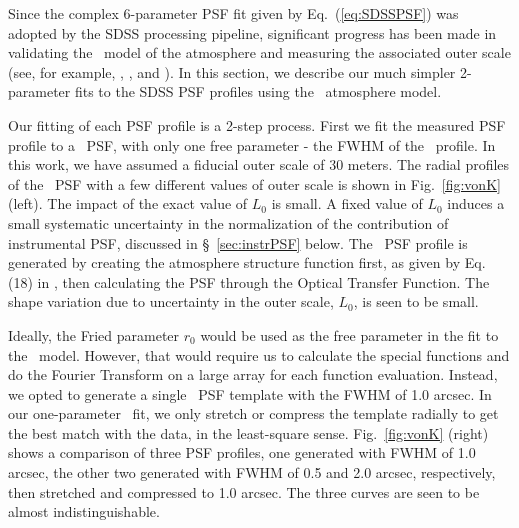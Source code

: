 

Since the complex 6-parameter PSF fit given by Eq.~(\ref{eq:SDSSPSF}) was adopted by 
the SDSS processing pipeline, significant progress has been made in validating the 
\vk~model of the atmosphere and measuring the associated outer
scale (see, for example, \citealt{Tokovinin2002}, \citealt{Boccas2004}, and \citealt{MartinezMessenger}).
In this section, we describe our much simpler 2-parameter fits to the SDSS PSF
profiles using the \vk~atmosphere model.

Our fitting of each PSF profile is a 2-step process. First we fit the
measured PSF profile to a \vk~PSF, with only one free parameter -
the FWHM of the \vk~profile.  
In this work, we have assumed a fiducial outer scale of 30 meters.
The radial profiles of the \vk~PSF with a few different values of 
outer scale is shown in Fig.~\ref{fig:vonK} (left). 
The impact of the exact value of $L_0$ is small. 
A fixed value of $L_0$ induces a small systematic uncertainty in 
the normalization of the contribution of instrumental PSF, discussed in \S~\ref{sec:instrPSF} 
below. 
The \vk~PSF profile is generated by creating the atmosphere
structure function first, as given by Eq. (18) in \cite{Tokovinin2002}, then calculating the
PSF through the Optical Transfer Function. 
The shape variation due to uncertainty in the outer scale, $L_0$, is seen to
be small. 

Ideally, the Fried parameter $r_0$ would be used as the free
parameter in the fit to the \vk~model. However, 
that would require us to calculate the special functions and do the
Fourier Transform on a large array for each function evaluation.
Instead, we opted to generate a single \vk~PSF template with the FWHM of 
1.0 arcsec. In our one-parameter \vk~fit, we only stretch or compress
the template radially to get the best match with the data, in the
least-square sense.
Fig.~\ref{fig:vonK} (right) shows a comparison of three PSF profiles,
one generated with FWHM of 1.0 arcsec, the other two generated with
FWHM of 0.5 and 2.0 arcsec, respectively, then stretched and
compressed to 1.0 arcsec. The three curves are seen to be almost
indistinguishable.

